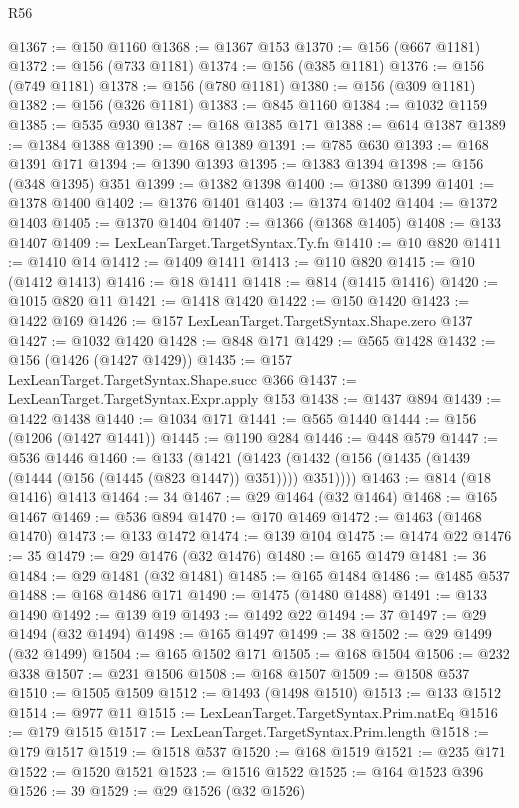 \begin{lexlean}{R56}
\begin{coremodule}
{{{{{{{{{{{{{{{{{{{{{{{{{{{{{{{{{{{{{{{{{{{{{{{{{{{{{{{{{{{{{{{{{{{{{{{{{{{{{{{{{{{{{{{{{{{{{{{{{{{{{{{{{{{{{{{{{{{{{{{{{{{{{{{{{{{{{{{{{{{{{{{{{{{{{{{{{{{{{{{{{{{{{{{{{{{{{{{{{{{{{{{{{{{{{{{{{{{{{{{{{{{{{{{{{{{@1367 := @150 @1160
@1368 := @1367 @153
@1370 := @156 (@667 @1181)
@1372 := @156 (@733 @1181)
@1374 := @156 (@385 @1181)
@1376 := @156 (@749 @1181)
@1378 := @156 (@780 @1181)
@1380 := @156 (@309 @1181)
@1382 := @156 (@326 @1181)
@1383 := @845 @1160
@1384 := @1032 @1159
@1385 := @535 @930
@1387 := @168 @1385 @171
@1388 := @614 @1387
@1389 := @1384 @1388
@1390 := @168 @1389
@1391 := @785 @630
@1393 := @168 @1391 @171
@1394 := @1390 @1393
@1395 := @1383 @1394
@1398 := @156 (@348 @1395) @351
@1399 := @1382 @1398
@1400 := @1380 @1399
@1401 := @1378 @1400
@1402 := @1376 @1401
@1403 := @1374 @1402
@1404 := @1372 @1403
@1405 := @1370 @1404
@1407 := @1366 (@1368 @1405)
@1408 := @133 @1407
@1409 := LexLeanTarget.TargetSyntax.Ty.fn
@1410 := @10 @820
@1411 := @1410 @14
@1412 := @1409 @1411
@1413 := @110 @820
@1415 := @10 (@1412 @1413)
@1416 := @18 @1411
@1418 := @814 (@1415 @1416)
@1420 := @1015 @820 @11
@1421 := @1418 @1420
@1422 := @150 @1420
@1423 := @1422 @169
@1426 := @157 LexLeanTarget.TargetSyntax.Shape.zero @137
@1427 := @1032 @1420
@1428 := @848 @171
@1429 := @565 @1428
@1432 := @156 (@1426 (@1427 @1429))
@1435 := @157 LexLeanTarget.TargetSyntax.Shape.succ @366
@1437 := LexLeanTarget.TargetSyntax.Expr.apply @153
@1438 := @1437 @894
@1439 := @1422 @1438
@1440 := @1034 @171
@1441 := @565 @1440
@1444 := @156 (@1206 (@1427 @1441))
@1445 := @1190 @284
@1446 := @448 @579
@1447 := @536 @1446
@1460 := @133
    (@1421 (@1423 (@1432 (@156 (@1435 (@1439 (@1444 (@156 (@1445 (@823 @1447)) @351)))) @351))))
@1463 := @814 (@18 @1416) @1413
@1464 := 34
@1467 := @29 @1464 (@32 @1464)
@1468 := @165 @1467
@1469 := @536 @894
@1470 := @170 @1469
@1472 := @1463 (@1468 @1470)
@1473 := @133 @1472
@1474 := @139 @104
@1475 := @1474 @22
@1476 := 35
@1479 := @29 @1476 (@32 @1476)
@1480 := @165 @1479
@1481 := 36
@1484 := @29 @1481 (@32 @1481)
@1485 := @165 @1484
@1486 := @1485 @537
@1488 := @168 @1486 @171
@1490 := @1475 (@1480 @1488)
@1491 := @133 @1490
@1492 := @139 @19
@1493 := @1492 @22
@1494 := 37
@1497 := @29 @1494 (@32 @1494)
@1498 := @165 @1497
@1499 := 38
@1502 := @29 @1499 (@32 @1499)
@1504 := @165 @1502 @171
@1505 := @168 @1504
@1506 := @232 @338
@1507 := @231 @1506
@1508 := @168 @1507
@1509 := @1508 @537
@1510 := @1505 @1509
@1512 := @1493 (@1498 @1510)
@1513 := @133 @1512
@1514 := @977 @11
@1515 := LexLeanTarget.TargetSyntax.Prim.natEq
@1516 := @179 @1515
@1517 := LexLeanTarget.TargetSyntax.Prim.length
@1518 := @179 @1517
@1519 := @1518 @537
@1520 := @168 @1519
@1521 := @235 @171
@1522 := @1520 @1521
@1523 := @1516 @1522
@1525 := @164 @1523 @396
@1526 := 39
@1529 := @29 @1526 (@32 @1526)
}}}}}}}}}}}}}}}}}}}}}}}}}}}}}}}}}}}}}}}}}}}}}}}}}}}}}}}}}}}}}}}}}}}}}}}}}}}}}}}}}}}}}}}}}}}}}}}}}}}}}}}}}}}}}}}}}}}}}}}}}}}}}}}}}}}}}}}}}}}}}}}}}}}}}}}}}}}}}}}}}}}}}}}}}}}}}}}}}}}}}}}}}}}}}}}}}}}}}}}}}}}}}}}}}}}
\end{coremodule}
\end{lexlean}
